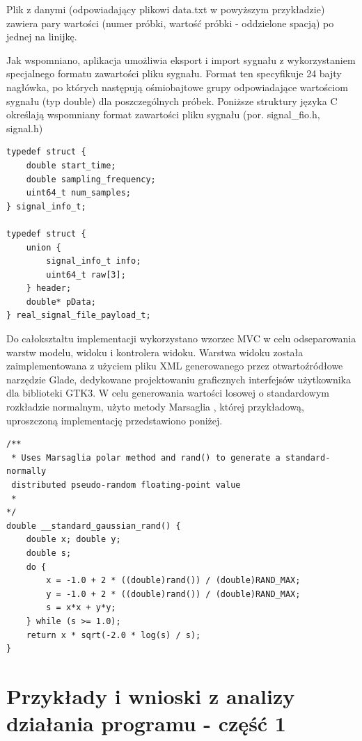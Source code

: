 \documentclass{article}
\begin{document}
Plik z danymi (odpowiadający plikowi data.txt w powyższym przykładzie) zawiera pary wartości (numer próbki, wartość próbki - oddzielone spacją) po jednej na linijkę.

Jak wspomniano, aplikacja umożliwia eksport i import sygnału z wykorzystaniem  specjalnego formatu zawartości pliku sygnału.
Format ten specyfikuje 24 bajty nagłówka, po których następują ośmiobajtowe  grupy odpowiadające wartościom sygnału (typ double) dla poszczególnych próbek.
Poniższe struktury języka C określają wspomniany format zawartości pliku sygnału (por. signal\_fio.h, signal.h)
\begin{verbatim}
typedef struct {
    double start_time;
    double sampling_frequency;
    uint64_t num_samples;
} signal_info_t;

typedef struct {
    union {
        signal_info_t info;
        uint64_t raw[3];
    } header;
    double* pData;
} real_signal_file_payload_t;
\end{verbatim}

Do całokształtu implementacji wykorzystano wzorzec MVC w celu odseparowania warstw modelu, widoku i kontrolera widoku. Warstwa widoku została zaimplementowana z użyciem pliku XML generowanego przez otwartoźródłowe narzędzie Glade, dedykowane projektowaniu graficznych interfejsów użytkownika dla biblioteki GTK3. 
W celu generowania wartości losowej o standardowym rozkładzie normalnym, użyto metody Marsaglia \cite{marsaglia_method_link}, której przykładową, uproszczoną implementację przedstawiono poniżej.
\begin{verbatim}
/**
 * Uses Marsaglia polar method and rand() to generate a standard-normally 
 distributed pseudo-random floating-point value
 * 
*/
double __standard_gaussian_rand() {
    double x; double y; 
    double s;
    do {
        x = -1.0 + 2 * ((double)rand()) / (double)RAND_MAX;
        y = -1.0 + 2 * ((double)rand()) / (double)RAND_MAX;
        s = x*x + y*y;
    } while (s >= 1.0);
    return x * sqrt(-2.0 * log(s) / s);
}
\end{verbatim}

\newpage
\section{Przykłady i wnioski z analizy działania programu - część 1}
\end{document}
